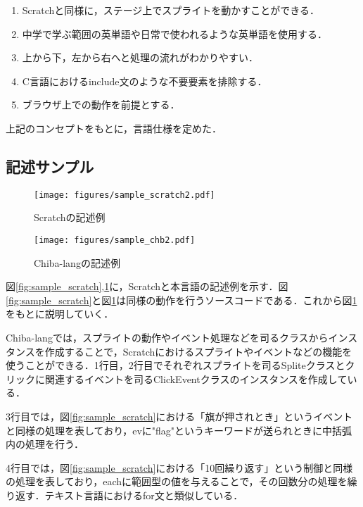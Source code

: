 \documentclass[twocolumn,10pt,a4j]{ltjsarticle}
\begin{document}
\begin{enumerate}
   \item[(1)] Scratchと同様に，ステージ上でスプライトを動かすことができる．
   \item[(2)] 中学で学ぶ範囲の英単語や日常で使われるような英単語を使用する．
   \item[(3)] 上から下，左から右へと処理の流れがわかりやすい．
   \item[(4)] C言語におけるinclude文のような不要要素を排除する．
   \item[(5)] ブラウザ上での動作を前提とする．
\end{enumerate}

上記のコンセプトをもとに，言語仕様を定めた．

\subsection{記述サンプル}
\begin{figure}[h]
  \begin{minipage}[b]{0.5\linewidth}
    \centering
    \texttt{[image: figures/sample\_scratch2.pdf]}
    \caption{Scratchの記述例}
    \label{fig:sample_scratch}
  \end{minipage}
  \begin{minipage}[b]{0.5\linewidth}
    \centering
    \texttt{[image: figures/sample\_chb2.pdf]}
    \caption{Chiba-langの記述例}
    \label{fig:sample_chb}
  \end{minipage}
\end{figure}

図\ref{fig:sample_scratch},\ref{fig:sample_chb}に，Scratchと本言語の記述例を示す．図\ref{fig:sample_scratch}と図\ref{fig:sample_chb}は同様の動作を行うソースコードである．これから図\ref{fig:sample_chb}をもとに説明していく．

Chiba-langでは，スプライトの動作やイベント処理などを司るクラスからインスタンスを作成することで，Scratchにおけるスプライトやイベントなどの機能を使うことができる．1行目，2行目でそれぞれスプライトを司るSpliteクラスとクリックに関連するイベントを司るClickEventクラスのインスタンスを作成している．

3行目では，図\ref{fig:sample_scratch}における「旗が押されとき」というイベントと同様の処理を表しており，evに"flag"というキーワードが送られときに中括弧内の処理を行う．

4行目では，図\ref{fig:sample_scratch}における「10回繰り返す」という制御と同様の処理を表しており，eachに範囲型の値を与えることで，その回数分の処理を繰り返す．テキスト言語におけるfor文と類似している．
\end{document}
